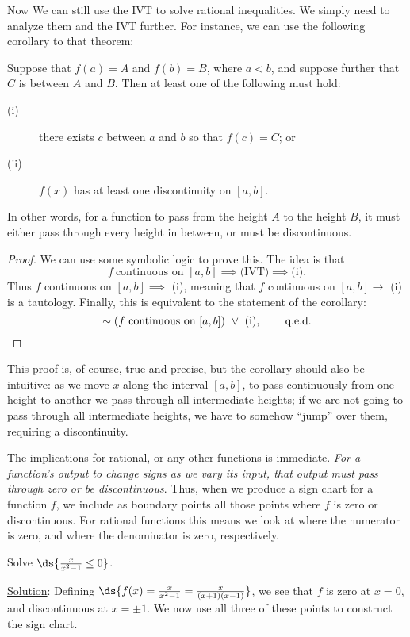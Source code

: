 Now We can still use the IVT to solve rational inequalities.
We simply need to analyze them and the IVT further. For instance, we
can use the following corollary to that theorem:

\begin{corollary} Suppose that $f(a)=A$ and $f(b)=B$, where
$a<b$, and suppose further that $C$ is between $A$ and $B$.
Then at least one of the following must hold:
\begin{description}
\item[(i)] there exists $c$ between $a$ and $b$ so that $f(c)=C$; or
\item[(ii)] $f(x)$ has at least one discontinuity on $[a,b]$.
\end{description}
\end{corollary}
In other words, for a function to pass from the height
$A$ to the height $B$, it must either pass through every
height in between, or must be discontinuous.

\begin{proof} We can use some symbolic logic to prove this.
The idea is that 
$$f\ \text{continuous on }[a,b]\implies \text{(IVT)}\implies 
{\text{(i)}}.$$
Thus $f$ continuous on $[a,b] \implies $ (i), meaning that
$f$ continuous on $[a,b] \longrightarrow $ (i) is a tautology.  
Finally,  this is 
equivalent to the statement of the corollary:
$$\sim (f \ \text{continuous on }[a,b])\ \vee\ \text{(i),
\qquad q.e.d.}$$
\end{proof}

This proof is, of course, true and precise, but the corollary should
also be intuitive:  as we move $x$  along the
interval $[a,b]$, to pass continuously from one height
to another we pass through all intermediate heights;
if we are not going to pass through all intermediate
heights, we have to somehow ``jump'' over them, requiring a
discontinuity.

The implications for rational, or any other functions
is immediate.  {\it For a function's output
to change signs as we vary its input, that output must
pass through zero or be discontinuous}.  Thus, when we
produce a sign chart for a function $f$, we include
as boundary points all those points where $f$ is zero or discontinuous.  
For rational functions this means we look at where the numerator is
zero, and where the denominator is zero,  respectively.

\bex Solve $\ds{\frac{x}{x^2-1}\le 0}$.


\underline{Solution}: Defining
$\ds{f(x)=\frac{x}{x^2-1}=\frac{x}{(x+1)(x-1)}}$, we see
that $f$ is zero at $x=0$, and discontinuous at $x=\pm1$.
We now use all three of these points to construct the
sign chart.


